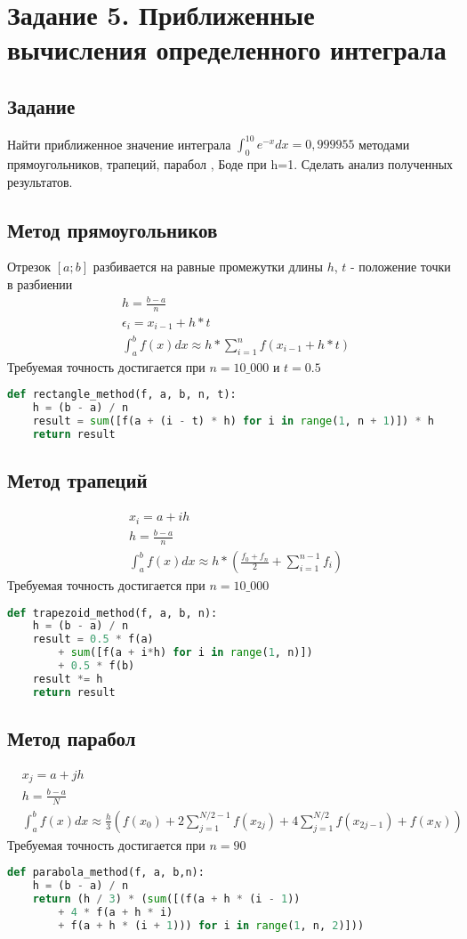\section{Задание 5. Приближенные вычисления определенного интеграла}
\subsection{Задание}
Найти приближенное значение интеграла $ \int_0^{10}{e^{-x}	dx} = 0,999955 $ методами прямоугольников, трапеций, парабол , Боде при h=1. Сделать анализ полученных результатов.
\subsection{Метод прямоугольников}
Отрезок $ [a;b] $ разбивается на равные промежутки длины $ h $, $ t $ - положение точки в разбиении 
\begin{align*}
	&h = \frac{b - a}{n} \\
	&\epsilon_i = x_{i - 1} + h * t \\
	&\int_{a}^{b} f(x)dx \approx h * \sum_{i = 1}^{n} f\left(x_{i-1} + h*t \right)
\end{align*}
Требуемая точность достигается при $ n = 10\_000 \text{ и } t = 0.5$
\begin{lstlisting}[language=Python]
def rectangle_method(f, a, b, n, t):
	h = (b - a) / n
	result = sum([f(a + (i - t) * h) for i in range(1, n + 1)]) * h
	return result
\end{lstlisting}
\subsection{Метод трапеций}
\begin{align*}
	&x_i = a + ih \\
	&h = \frac{b - a}{n} \\
	&\int_a^b f(x) dx \approx h * \left(\frac{f_0 + f_n}{2} + \sum_{i = 1}^{n-1} f_i\right)
\end{align*}
Требуемая точность достигается при $ n = 10\_000 $
\begin{lstlisting}[language=Python]
def trapezoid_method(f, a, b, n):
	h = (b - a) / n
	result = 0.5 * f(a) 
		+ sum([f(a + i*h) for i in range(1, n)]) 
		+ 0.5 * f(b)
	result *= h
	return result
\end{lstlisting}
\subsection{Метод парабол}
\begin{align*}
	&x_j = a + jh \\
	&h = \frac{b - a}{N} \\
	&\int_a^b f(x) dx \approx \frac{h}{3} \left(f(x_0)  + 2\sum_{j=1}^{N/2-1}f(x_{2j}) + 4\sum_{j=1}^{N/2}f(x_{2j-1}) + f(x_N)\right)
\end{align*}
Требуемая точность достигается при $ n = 90 $
\begin{lstlisting}[language=Python]
def parabola_method(f, a, b,n):
	h = (b - a) / n
	return (h / 3) * (sum([(f(a + h * (i - 1)) 
		+ 4 * f(a + h * i) 
		+ f(a + h * (i + 1))) for i in range(1, n, 2)]))
\end{lstlisting}
\newpage
